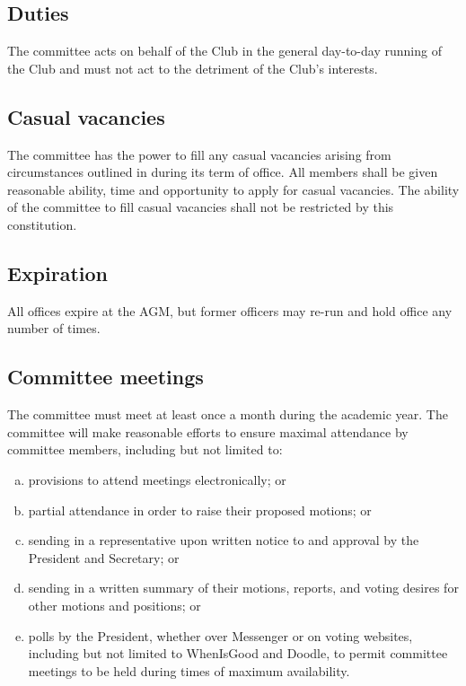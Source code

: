 \documentclass{constitution}
\begin{document}
\subsection{Duties}
The committee acts on behalf of the Club in the general day-to-day running of the Club and must not act to the detriment of the Club's interests.

\subsection{Casual vacancies}\label{committeeCasualVacancies}
The committee has the power to fill any casual vacancies arising from circumstances outlined in  during its term of office. All members shall be given reasonable ability, time and opportunity to apply for casual vacancies. The ability of the committee to fill casual vacancies shall not be restricted by this constitution.

\subsection{Expiration}
All offices expire at the AGM, but former officers may re-run and hold office any number of times.

\subsection{Committee meetings}
The committee must meet at least once a month during the academic year. The committee will make reasonable efforts to ensure maximal attendance by committee members, including but not limited to:
\begin{enumerate}[(a)]
    \item provisions to attend meetings electronically; or
    \item partial attendance in order to raise their proposed motions; or
    \item sending in a representative upon written notice to and approval by the President and Secretary; or
    \item sending in a written summary of their motions, reports, and voting desires for other motions and positions; or
    \item polls by the President, whether over Messenger or on voting websites, including but not limited to WhenIsGood and Doodle, to permit committee meetings to be held during times of maximum availability. %
\end{enumerate}
\end{document}
